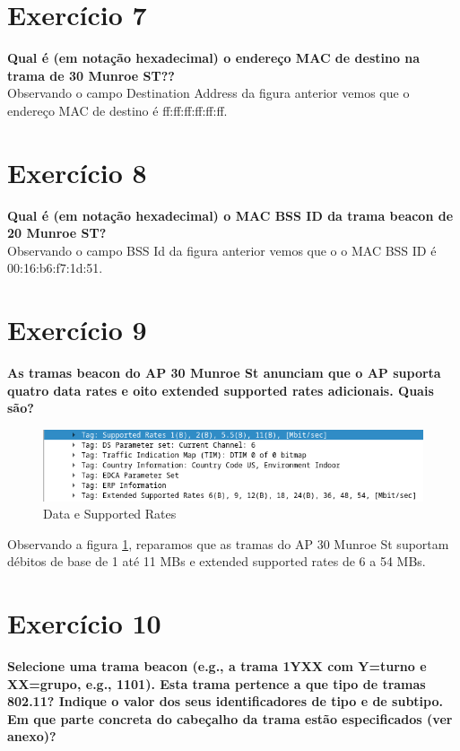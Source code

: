 \documentclass[a4paper]{report}
\begin{document}
\section{Exercício 7}
\textbf{Qual é (em notação hexadecimal) o endereço MAC de destino na trama de 30
Munroe ST??}\\
Observando o campo Destination Address da figura anterior vemos que o endereço
MAC de destino é ff:ff:ff:ff:ff:ff.

\section{Exercício 8}
\textbf{Qual é (em notação hexadecimal) o MAC BSS ID da trama beacon de 20
Munroe ST?}\\
Observando o campo BSS Id da figura anterior vemos que o o MAC BSS ID é
00:16:b6:f7:1d:51.

\section{Exercício 9}
\textbf{As tramas beacon do AP 30 Munroe St anunciam que o AP suporta quatro
data rates e oito extended supported rates adicionais. Quais são?}

\begin{figure}[H]
    \centering 
    \includegraphics[width=\textwidth]{images/supportedRatesEx9.png}  
    \caption{Data e Supported Rates}
    \label{fig:supportedRatesEx9}
\end{figure}
Observando a figura \ref{fig:supportedRatesEx9}, reparamos que as tramas do AP
30 Munroe St suportam débitos de base de 1 até 11 MBs e extended supported rates de
6 a 54 MBs.

\section{Exercício 10}
\textbf{Selecione uma trama beacon (e.g., a trama 1YXX com Y=turno e XX=grupo,
e.g., 1101). Esta trama pertence a que tipo de tramas 802.11? Indique o
valor dos seus identificadores de tipo e de subtipo. Em que parte concreta
do cabeçalho da trama estão especificados (ver anexo)?}
\end{document}

